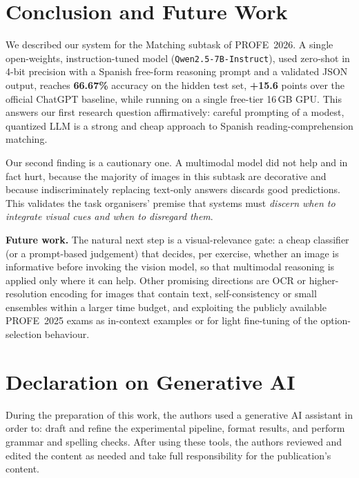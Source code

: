\documentclass{ceurart}   %
\begin{document}
\section{Conclusion and Future Work}
We described our system for the Matching subtask of PROFE~2026. A single
open-weights, instruction-tuned model (\texttt{Qwen2.5-7B-Instruct}), used
zero-shot in 4-bit precision with a Spanish free-form reasoning prompt and a
validated JSON output, reaches \textbf{66.67\%} accuracy on the hidden test
set, \textbf{+15.6} points over the official ChatGPT baseline, while running
on a single free-tier 16\,GB GPU. This answers our first research question
affirmatively: careful prompting of a modest, quantized LLM is a strong and
cheap approach to Spanish reading-comprehension matching.

Our second finding is a cautionary one. A multimodal model did not help and
in fact hurt, because the majority of images in this subtask are decorative
and because indiscriminately replacing text-only answers discards good
predictions. This validates the task organisers' premise that systems must
\emph{discern when to integrate visual cues and when to disregard them}.

\textbf{Future work.} The natural next step is a visual-relevance gate: a
cheap classifier (or a prompt-based judgement) that decides, per exercise,
whether an image is informative before invoking the vision model, so that
multimodal reasoning is applied only where it can help. Other promising
directions are OCR or higher-resolution encoding for images that contain
text, self-consistency or small ensembles within a larger time budget, and
exploiting the publicly available PROFE~2025 exams as in-context examples or
for light fine-tuning of the option-selection behaviour.

\section*{Declaration on Generative AI}
During the preparation of this work, the authors used a generative AI
assistant in order to: draft and refine the experimental pipeline, format
results, and perform grammar and spelling checks. After using these tools,
the authors reviewed and edited the content as needed and take full
responsibility for the publication's content.


\end{document}
